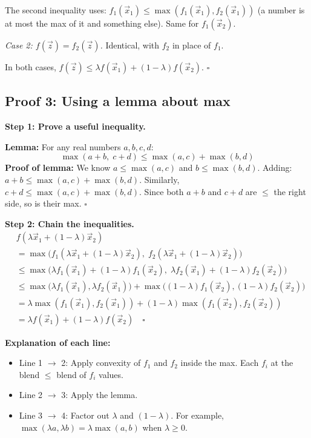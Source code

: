 \documentclass[10pt]{article}
\theoremstyle{definition}
\theoremstyle{plain}
\begin{document}
The second inequality uses: $f_1(\vec{x}_1) \le \max(f_1(\vec{x}_1), f_2(\vec{x}_1))$ (a number is at most the max of it and something else). Same for $f_1(\vec{x}_2)$.

\textit{Case 2: $f(\vec{z}) = f_2(\vec{z})$.} Identical, with $f_2$ in place of $f_1$.

In both cases, $f(\vec{z}) \le \lambda f(\vec{x}_1) + (1-\lambda)f(\vec{x}_2)$. $\square$

\subsection{Proof 3: Using a lemma about max}

\textbf{Step 1: Prove a useful inequality.}

\begin{result}
\textbf{Lemma:} For any real numbers $a, b, c, d$:
\[
    \max(a + b, \; c + d) \le \max(a, c) + \max(b, d)
\]
\textbf{Proof of lemma:} We know $a \le \max(a,c)$ and $b \le \max(b,d)$. Adding: $a + b \le \max(a,c) + \max(b,d)$. Similarly, $c + d \le \max(a,c) + \max(b,d)$. Since both $a + b$ and $c + d$ are $\le$ the right side, so is their max. $\square$
\end{result}

\textbf{Step 2: Chain the inequalities.}
\begin{align*}
    &f(\lambda \vec{x}_1 + (1-\lambda)\vec{x}_2) \\
    &= \max\big(f_1(\lambda \vec{x}_1 + (1-\lambda)\vec{x}_2), \; f_2(\lambda \vec{x}_1 + (1-\lambda)\vec{x}_2)\big) \\
    &\le \max\big(\lambda f_1(\vec{x}_1) + (1-\lambda) f_1(\vec{x}_2), \; \lambda f_2(\vec{x}_1) + (1-\lambda) f_2(\vec{x}_2)\big) \\
    &\le \max\big(\lambda f_1(\vec{x}_1), \lambda f_2(\vec{x}_1)\big) + \max\big((1-\lambda) f_1(\vec{x}_2), (1-\lambda) f_2(\vec{x}_2)\big) \\
    &= \lambda \max(f_1(\vec{x}_1), f_2(\vec{x}_1)) + (1-\lambda)\max(f_1(\vec{x}_2), f_2(\vec{x}_2)) \\
    &= \lambda f(\vec{x}_1) + (1-\lambda) f(\vec{x}_2) \quad \square
\end{align*}

\textbf{Explanation of each line:}
\begin{itemize}
    \item Line 1 $\to$ 2: Apply convexity of $f_1$ and $f_2$ inside the max. Each $f_i$ at the blend $\le$ blend of $f_i$ values.
    \item Line 2 $\to$ 3: Apply the lemma.
    \item Line 3 $\to$ 4: Factor out $\lambda$ and $(1-\lambda)$. For example, $\max(\lambda a, \lambda b) = \lambda \max(a, b)$ when $\lambda \ge 0$.
\end{itemize}
\end{document}
